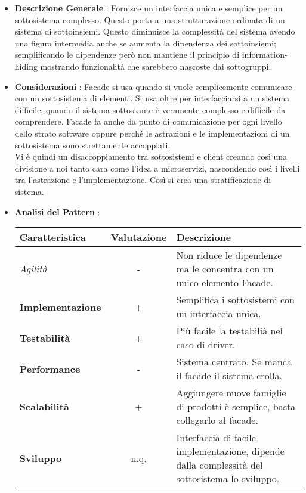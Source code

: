 {{{			\begin{itemize}\itemsep1pt
				\item \textbf{Descrizione Generale} : Fornisce un interfaccia unica e semplice per un sottosistema complesso. Questo porta a una strutturazione ordinata di un sistema di sottoinsiemi. Questo diminuisce la complessità del sistema avendo una figura intermedia anche se aumenta la dipendenza dei sottoinsiemi; semplificando le dipendenze però non mantiene il principio di information-hiding mostrando funzionalità che sarebbero nascoste dai sottogruppi.
				\item \textbf{Considerazioni} : Facade si usa quando si vuole semplicemente comunicare con un sottosistema di elementi. Si usa oltre per interfacciarsi a un sistema difficile, quando il sistema sottostante è veramente complesso e difficile da comprendere. Facade fa anche da punto di comunicazione per ogni livello dello strato software oppure perché le astrazioni e le implementazioni di un sottosistema sono strettamente accoppiati.\\
				Vi è quindi un disaccoppiamento tra sottosistemi e client creando così una divisione a noi tanto cara come l'idea a microservizi, nascondendo così i livelli tra l'astrazione e l'implementazione. Così si crea una stratificazione di sistema.
				\item \textbf{Analisi del Pattern} : %
				\small %
				{\renewcommand\arraystretch{1.2} %
					\begin{tabular}{|l|c|l|}
						\hline
						{\textbf{Caratteristica}}&{\textbf{Valutazione}}&{\textbf{Descrizione}}\\
						\hline
						\textit{Agilità} & - & Non riduce le dipendenze ma le concentra con un unico elemento Facade. \\
						\hline
						\textbf{Implementazione} & + & Semplifica i sottosistemi con un interfaccia unica. \\
						\hline
						\textbf{Testabilità} & + & Più facile la testabilià nel caso di driver. \\
						\hline
						\textbf{Performance} & - & Sistema centrato. Se manca il facade il sistema crolla. \\
						\hline
						\textbf{Scalabilità} & + & Aggiungere nuove famiglie di prodotti è semplice, basta collegarlo al facade. \\
						\hline
						\textbf{Sviluppo} & n.q. & Interfaccia di facile implementazione, dipende dalla complessità del sottosistema lo sviluppo. \\
						\hline
					\end{tabular}
				}
			\end{itemize}
		}
	}
}
